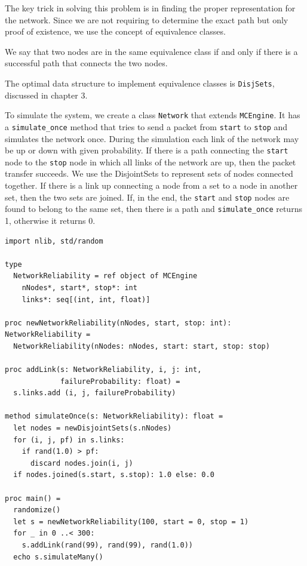 \documentclass[justified, sixbynine]{tufte-book}
\def\ft{\small\tt}
\theoremstyle{plain}%
\newtheorem * {corollary}{Corollary}
\theoremstyle{definition}
\theoremstyle{remark}
\newtheorem * {remark}{Remark}
\newtheorem * {note}{Note}
\begin{document}
\begin{fullwidth}
The key trick in solving this problem is in finding the proper
representation for the network. Since we are not requiring to determine the
exact path but only proof of existence, we use the concept of equivalence classes.

We say that two nodes are in the same equivalence class if and only
if there is a successful path that connects the two nodes.

The optimal data structure to implement equivalence classes is {\ft DisjSets}, discussed in chapter 3.

To simulate the system, we create a class {\ft Network} that extends {\ft MCEngine}. It has a {\ft simulate\_once} method that tries to send a packet from {\ft start} to
{\ft stop} and simulates the network once. During the simulation each link of the network may be up or down with given probability. If there is a path connecting the {\ft start} node to the {\ft stop} node in which all links of the network are up, then the packet transfer succeeds. We use the DisjointSets to represent sets of nodes connected together. If there is a link up connecting a node from a set to a node in another set, then the two sets are joined. If, in the end, the {\ft start} and {\ft stop} nodes are found to belong to the same set, then there is a path and {\ft simulate\_once} returns 1, otherwise it returns 0.


\begin{lstlisting}[caption={in file: {\ft network.nim}}]
import nlib, std/random

type
  NetworkReliability = ref object of MCEngine
    nNodes*, start*, stop*: int
    links*: seq[(int, int, float)]

proc newNetworkReliability(nNodes, start, stop: int): NetworkReliability =
  NetworkReliability(nNodes: nNodes, start: start, stop: stop)

proc addLink(s: NetworkReliability, i, j: int,
             failureProbability: float) =
  s.links.add (i, j, failureProbability)

method simulateOnce(s: NetworkReliability): float =
  let nodes = newDisjointSets(s.nNodes)
  for (i, j, pf) in s.links:
    if rand(1.0) > pf:
      discard nodes.join(i, j)
  if nodes.joined(s.start, s.stop): 1.0 else: 0.0

proc main() =
  randomize()
  let s = newNetworkReliability(100, start = 0, stop = 1)
  for _ in 0 ..< 300:
    s.addLink(rand(99), rand(99), rand(1.0))
  echo s.simulateMany()


\end{lstlisting}
\end{fullwidth}
\end{document}
